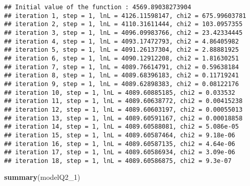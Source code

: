\documentclass[
]{article}
\newenvironment{Shaded}{\begin{snugshade}}{\end{snugshade}}
\newcommand{\DecValTok}[1]{\textcolor[rgb]{0.00,0.00,0.81}{#1}}
\newcommand{\KeywordTok}[1]{\textcolor[rgb]{0.13,0.29,0.53}{\textbf{#1}}}
\newcommand{\NormalTok}[1]{#1}
\begin{document}
\begin{verbatim}
## Initial value of the function : 4569.89038273904 
## iteration 1, step = 1, lnL = 4126.11598147, chi2 = 675.99603781
## iteration 2, step = 1, lnL = 4110.31611444, chi2 = 103.0957355
## iteration 3, step = 1, lnL = 4096.09983766, chi2 = 23.42334445
## iteration 4, step = 1, lnL = 4093.17472793, chi2 = 4.86405982
## iteration 5, step = 1, lnL = 4091.26137304, chi2 = 2.88881925
## iteration 6, step = 1, lnL = 4090.12912208, chi2 = 1.81630251
## iteration 7, step = 1, lnL = 4089.76614791, chi2 = 0.59638184
## iteration 8, step = 1, lnL = 4089.68396183, chi2 = 0.11719241
## iteration 9, step = 1, lnL = 4089.62898383, chi2 = 0.08122176
## iteration 10, step = 1, lnL = 4089.60885185, chi2 = 0.033532
## iteration 11, step = 1, lnL = 4089.60638772, chi2 = 0.00415238
## iteration 12, step = 1, lnL = 4089.60603197, chi2 = 0.00055013
## iteration 13, step = 1, lnL = 4089.60591167, chi2 = 0.00018858
## iteration 14, step = 1, lnL = 4089.60588081, chi2 = 5.086e-05
## iteration 15, step = 1, lnL = 4089.60587464, chi2 = 9.18e-06
## iteration 16, step = 1, lnL = 4089.60587135, chi2 = 4.64e-06
## iteration 17, step = 1, lnL = 4089.60586934, chi2 = 3.09e-06
## iteration 18, step = 1, lnL = 4089.60586875, chi2 = 9.3e-07
\end{verbatim}

\begin{Shaded}
\begin{Highlighting}[]
\KeywordTok{summary}\NormalTok{(modelQ2_}\DecValTok{1}\NormalTok{)}
\end{Highlighting}
\end{Shaded}
\end{document}
